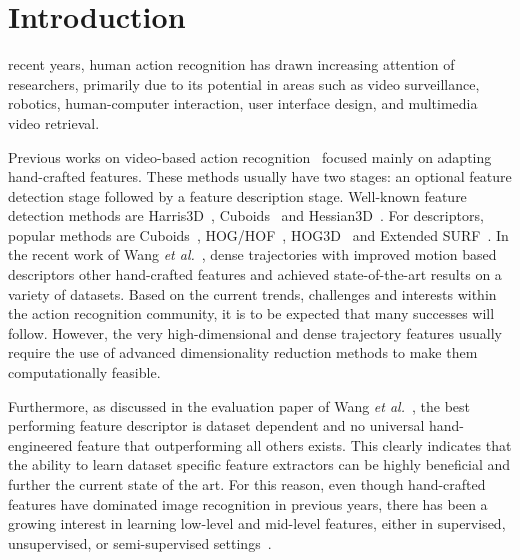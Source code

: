 

\section{Introduction}
\label{sec:introduction}

 recent years, human action recognition has drawn increasing attention of researchers, primarily due to its potential in areas such as video surveillance, robotics, human-computer interaction, user interface design, and multimedia video retrieval.

Previous works on video-based action recognition~\cite{liuli,xiantong,diwu2} focused mainly on adapting hand-crafted features. %
These methods usually have two stages: an optional feature detection stage followed by a feature description stage. Well-known feature detection methods are Harris3D~\cite{laptev2005space}, Cuboids~\cite{dollar2005behavior} and Hessian3D~\cite{hession3d}. For descriptors, popular methods are Cuboids~\cite{scovanner20073}, HOG/HOF~\cite{laptev2005space}, HOG3D~\cite{klaser:inria-00514853} and Extended SURF~\cite{hession3d}.
In the recent work of Wang \textit{et al.}~\cite{wang2013dense}, dense trajectories with improved motion based descriptors other hand-crafted features and achieved state-of-the-art results on a variety of datasets.
Based on the current trends, challenges and interests within the action recognition community, it is to be expected that many successes will follow. However, the very high-dimensional and dense trajectory features usually require the use of advanced dimensionality reduction methods to make them computationally feasible.

Furthermore, as discussed in the evaluation paper of Wang \emph{et al.}~\cite{wang2009evaluation}, the best performing feature descriptor is dataset dependent and no universal hand-engineered feature that outperforming all others exists. This clearly indicates that the ability to learn dataset specific feature extractors can be highly beneficial and further the current state of the art.
For this reason, even though hand-crafted features have dominated image recognition in previous years, there has been a growing interest in learning low-level and mid-level features, either in supervised, unsupervised, or semi-supervised settings~\cite{taylor2010convolutional,le2011learning,baccouche2005spatio}.


